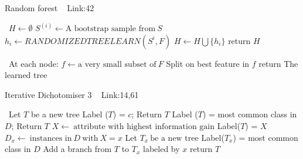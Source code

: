 \documentclass[a4paper]{article}
\begin{document}
  \begin{algorithm}
   \caption{Random forest ~\cite{randomforest1} Link:{42} }
    \begin{algorithmic}[1]
      \
      \State $H \leftarrow  \emptyset $
            \State $S^{(i)}\leftarrow \text{A bootstrap sample from} \  S $
            \State $h_i \leftarrow RANDOMIZEDTREELEARN(S^{i},F)$
            \State $H \leftarrow H \bigcup \{h_i\}$
        \EndFor
        \State return $H$
        
        
         



 \EndFunction

  \ 
  \State At each node:
  \State $f \leftarrow \text{a very small subset of} \ F $
  \State Split on best feature in $f$
  \State return The learned tree
   \EndFunction

\end{algorithmic}
\end{algorithm}







  \begin{algorithm}
   \caption{Iterative Dichotomiser 3 ~\cite{id3algo1} Link:{14,61}}
    \begin{algorithmic}[1]
      \Function{ID3}{$D,X$}\
      \State Let $T$ be a new tree 
      \State Label ($T$) = $c$; Return $T$
      \EndIf
      \State Label ($T$) = most common class in $D$; Return $T$
      \EndIf
      \State $X \leftarrow \ \text{attribute with highest information gain} $
      \State Label($T$) = $X$
            \State $D_x \leftarrow \ \text{instances in} \ D \ \text{with} \ X = x $
           \State Let $T_x \ \text{be a new tree}$
           \State Label($T_x$) = most common class in $D$
           \EndIf
            \State Add a branch from $T$ to $T_x$ labeled by $x$
        \EndFor
        \State return $T$
         



 \EndFunction

 
\end{algorithmic}
\end{algorithm}
\end{document}
